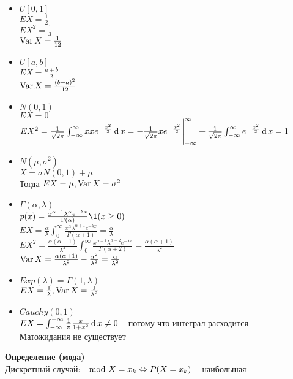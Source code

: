 \documentclass[12pt]{article}
\begin{document}
\begin{itemize}
    \item $U[0,1]$\\
    $EX = \frac12$\\
    $EX^2 = \frac13$\\
    $\operatorname{Var} X = \frac1{12}$
    \item $U[a,b]$\\
    $EX = \frac{a+b}{2}$\\
    $\operatorname{Var} X = \frac{(b-a)^2}{12}$
    \item $N(0, 1)$\\
    $EX = 0$\\
    $EX^2 = \frac{1}{\sqrt{2\pi}} \int_{-\infty}^\infty xxe^{-\frac{x^2}2}\operatorname{d} x = - \frac{1}{\sqrt{2\pi}}xe^{-\frac{x^2}2}\Biggr|_{-\infty}^\infty + \frac{1}{\sqrt{2\pi}} \int_{-\infty}^\infty e^{-\frac{x^2}{2}}\operatorname{d} x = 1$\\
    \item $N(\mu, \sigma^2)$\\
    $X = \sigma N(0,1) + \mu$\\
    Тогда $EX = \mu, \operatorname{Var} X = \sigma^2$
    \item $\Gamma(\alpha, \lambda)$\\
    $p(x) = \frac{x^{\alpha-1}\lambda^\alpha e^{-\lambda x}}{\Gamma(\alpha)}\1(x \geq 0)$\\
    $EX = \frac{\alpha}{\lambda}\int_0^\infty \frac{x^\alpha\lambda^{\alpha+1} e^{-\lambda x}}{\Gamma(\alpha+1)} = \frac{\alpha}{\lambda}$\\
    $EX^2 = \frac{\alpha(\alpha+1)}{\lambda^2}\int_0^\infty \frac{x^{\alpha+1}\lambda^{\alpha+2} e^{-\lambda x}}{\Gamma(\alpha+2)} = \frac{\alpha(\alpha+1)}{\lambda^2}$\\
    $\operatorname{Var} X = \frac{\alpha(\alpha+1)}{\lambda^2} - \frac{\alpha^2}{\lambda^2} = \frac{\alpha}{\lambda^2}$
    \item $Exp(\lambda) = \Gamma(1, \lambda)$\\
    $EX = \frac1\lambda, \operatorname{Var} X = \frac1{\lambda^2}$
    \item $Cauchy(0, 1)$\\
    $EX = \int_{-\infty}^{+\infty} \frac{1}{\pi} \frac{x}{1+x^2}\operatorname{d} x \neq 0$ -- потому что интеграл расходится\\
    Матожидания не существует
\end{itemize}
\textbf{Определение (мода)}\\
Дискретный случай: $\mod X = x_k \Leftrightarrow P(X = x_k)$ -- наибольшая\\
\end{document}

